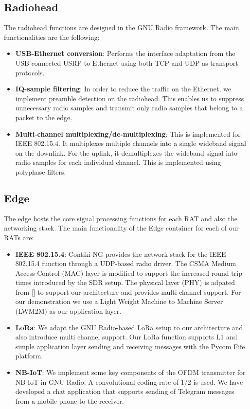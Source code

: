 \documentclass[10pt,emptycopyrightspace]{ewsn-proc}
\begin{document}
\subsection{Radiohead}
The radiohead functions are designed in the GNU Radio framework. The main functionalities are the following:
\begin{itemize}
	\item \textbf{USB-Ethernet conversion}: Performs the interface adaptation from the USB-connected USRP to Ethernet using both TCP and UDP as transport protocols.
	
	\item \textbf{IQ-sample filtering}: In order to reduce the traffic on the Ethernet, we implement preamble detection on the radiohead. This enables us to suppress unnecessary radio samples and transmit only radio samples that belong to a packet to the edge. 
	
	\item \textbf{Multi-channel multiplexing/de-multiplexing}: This is implemented for IEEE 802.15.4. It multiplexes multiple channels into a single wideband signal on the downlink. For the uplink, it demultiplexes the wideband signal into radio samples for each individual channel. This is implemented using polyphase filters.
	
\end{itemize}
\subsection{Edge}
The edge hosts the core signal processing functions for each RAT and also the networking stack. The main functionality of the Edge container for each of our RATs are:
\begin{itemize}
	\item \textbf{IEEE 802.15.4}: Contiki-NG provides the network stack for the IEEE 802.15.4 function through a UDP-based radio driver. The CSMA Medium Access Control (MAC) layer is modified to support the increased round trip times introduced by the SDR setup. The physical layer (PHY) is adpated from [] to support our architecture and provides multi channel support. For our demonstration we use a Light Weight Machine to Machine Server (LWM2M) as our application layer. 		
	\item \textbf{LoRa}: We adapt the GNU Radio-based LoRa setup to our architecture and also introduce multi channel support. Our LoRa function supports L1 and simple application layer sending and receiving messages with the Pycom Fife platform.
	

	\item \textbf{NB-IoT}: We implement some key components of the OFDM transmitter for NB-IoT in GNU Radio. A convolutional coding rate of 1/2 is used. We have developed a chat application that supports sending of Telegram messages from a mobile phone to the receiver.
\end{itemize}
\end{document}
